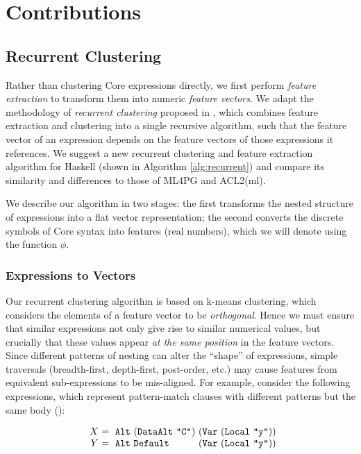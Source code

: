 \section{Contributions}
\label{sec:contributions}

\subsection{Recurrent Clustering}
\label{sec:recurrentclustering}

Rather than clustering Core expressions directly, we first perform \emph{feature extraction} to transform them into numeric \emph{feature vectors}. We adapt the methodology of \emph{recurrent clustering} proposed in \cite{DBLP:journals/corr/HerasK14} \cite{heras2013proof}, which combines feature extraction and clustering into a single recursive algorithm, such that the feature vector of an expression depends on the feature vectors of those expressions it references. We suggest a new recurrent clustering and feature extraction algorithm for Haskell (shown in Algorithm \ref{alg:recurrent}) and compare its similarity and differences to those of ML4PG and ACL2(ml).

We describe our algorithm in two stages: the first transforms the nested structure of expressions into a flat vector representation; the second converts the discrete symbols of Core syntax into features (real numbers), which we will denote using the function $\phi$.

\subsubsection{Expressions to Vectors}
\label{sec:expressionstovectors}

Our recurrent clustering algorithm is based on k-means clustering, which considers the elements of a feature vector to be \emph{orthogonal}. Hence we must ensure that similar expressions not only give rise to similar numerical values, but crucially that these values appear \emph{at the same position} in the feature vectors. Since different patterns of nesting can alter the ``shape'' of expressions, simple traversals (breadth-first, depth-first, post-order, etc.) may cause features from equivalent sub-expressions to be mis-aligned. For example, consider the following expressions, which represent pattern-match clauses with different patterns but the same body ():

\begin{equation}\label{eq:xy}
  \begin{array}{r@{}l@{}l@{}}
    X\ &=\ \CAlt\ (\CDataAlt\ \id{C})\ & (\vlocal{y}) \\
    Y\ &=\ \CAlt\ \CDefault\           & (\vlocal{y})
  \end{array}
\end{equation}

